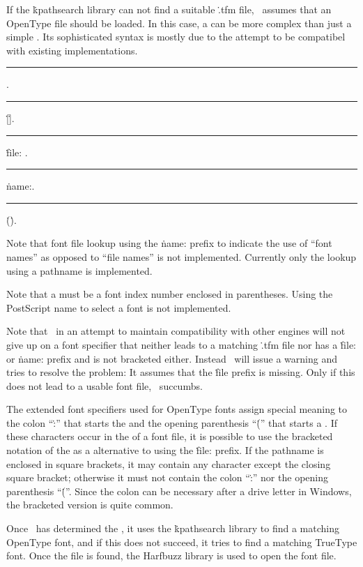 If the  \.{kpathsearch} library can not find a suitable \.{.tfm} file,
\HiTeX\ assumes that an OpenType file should be loaded.
In this case, a  can be more complex than just a simple  .
Its sophisticated syntax is mostly
due to the attempt to be compatibel with existing implementations.

\medskip
\rule{}:  .
\rule{}: \.{[}\.{]}.
\rule{}: \.{file:} .
\rule{}: \.{name:}.
\rule{}: \.{(}\.{)}.
\smallskip

\itemize
\item Note that font file lookup using the \.{name:} prefix to indicate the use
of ``font names'' as opposed to ``file names'' is not implemented.
Currently only the lookup using a pathname is implemented.

\item Note that a  must be a font index number enclosed in parentheses.
Using the PostScript name to select a font is not implemented.

\item Note that \HiTeX\ in an attempt to maintain compatibility with other engines
will not give up on a font specifier that neither leads to a matching \.{.tfm} file
nor has a \.{file:} or \.{name:} prefix and is not bracketed either.
Instead \HiTeX\ will issue a warning and tries to resolve the problem:
It assumes that the \.{file} prefix is missing.
Only if this does not lead to a usable font file, \HiTeX\ succumbs.
\enditemize

The extended font specifiers used for OpenType fonts
assign special meaning to the colon ``\.{:}'' that starts the 
and the opening parenthesis ``\.{(}'' that starts a .
If these characters occur in the  of a font file, it is possible to use
the bracketed notation of the  as a alternative to using the \.{file:} prefix.
If the pathname is enclosed in square brackets, it may
contain any character except the closing square bracket; otherwise it must not contain
the colon ``\.{:}'' nor the opening parenthesis ``\.{(}''.
Since the colon can be necessary after a drive letter in Windows,
the bracketed version is quite common.

Once \HiTeX\ has determined the , it uses the \.{kpathsearch} library to
find a matching OpenType font, and if this does not succeed, it tries to find a matching
TrueType font. Once the file is found, the Harfbuzz library is used to open the font file.

